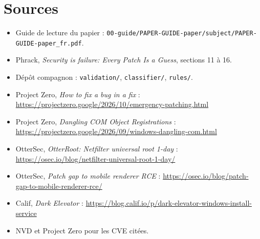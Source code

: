 \documentclass{training}
\begin{document}
\chapter{Sources}
\begin{itemize}
  \item Guide de lecture du papier :
        \texttt{00-guide/PAPER-GUIDE-paper/subject/PAPER-GUIDE-paper\_fr.pdf}.
  \item Phrack, \emph{Security is failure: Every Patch Is a Guess},
        sections 11 à 16.
  \item Dépôt compagnon : \texttt{validation/}, \texttt{classifier/},
        \texttt{rules/}.
  \item Project Zero, \emph{How to fix a bug in a fix} :
        \url{https://projectzero.google/2026/10/emergency-patching.html}
  \item Project Zero, \emph{Dangling COM Object Registrations} :
        \url{https://projectzero.google/2026/09/windows-dangling-com.html}
  \item OtterSec, \emph{OtterRoot: Netfilter universal root 1-day} :
        \url{https://osec.io/blog/netfilter-universal-root-1-day/}
  \item OtterSec, \emph{Patch gap to mobile renderer RCE} :
        \url{https://osec.io/blog/patch-gap-to-mobile-renderer-rce/}
  \item Calif, \emph{Dark Elevator} :
        \url{https://blog.calif.io/p/dark-elevator-windows-install-service}
  \item NVD et Project Zero pour les CVE citées.
\end{itemize}

\end{document}
